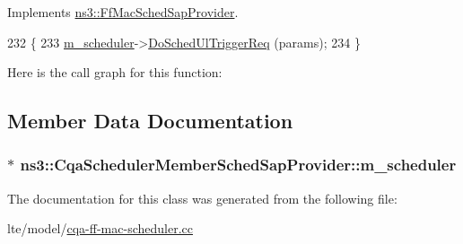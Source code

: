 Implements \hyperlink{classns3_1_1FfMacSchedSapProvider_a7bd978ea17a587a1626ef684be006c04}{ns3\+::\+Ff\+Mac\+Sched\+Sap\+Provider}.


\begin{DoxyCode}
232 \{
233   \hyperlink{classns3_1_1CqaSchedulerMemberSchedSapProvider_ab296b58e9d62b7dc2224e0dc2f0f3835}{m\_scheduler}->\hyperlink{classns3_1_1CqaFfMacScheduler_a8f3fcee098da3381bf6383f876d80da9}{DoSchedUlTriggerReq} (params);
234 \}
\end{DoxyCode}


Here is the call graph for this function\+:




\subsection{Member Data Documentation}
\subsubsection[{\texorpdfstring{m\+\_\+scheduler}{m_scheduler}}]{$\ast$ ns3\+::\+Cqa\+Scheduler\+Member\+Sched\+Sap\+Provider\+::m\+\_\+scheduler\hspace{0.3cm}{\ttfamily [private]}}\hypertarget{classns3_1_1CqaSchedulerMemberSchedSapProvider_ab296b58e9d62b7dc2224e0dc2f0f3835}{}\label{classns3_1_1CqaSchedulerMemberSchedSapProvider_ab296b58e9d62b7dc2224e0dc2f0f3835}


The documentation for this class was generated from the following file\+:\begin{DoxyCompactItemize}
\item 
lte/model/\hyperlink{cqa-ff-mac-scheduler_8cc}{cqa-\/ff-\/mac-\/scheduler.\+cc}\end{DoxyCompactItemize}
